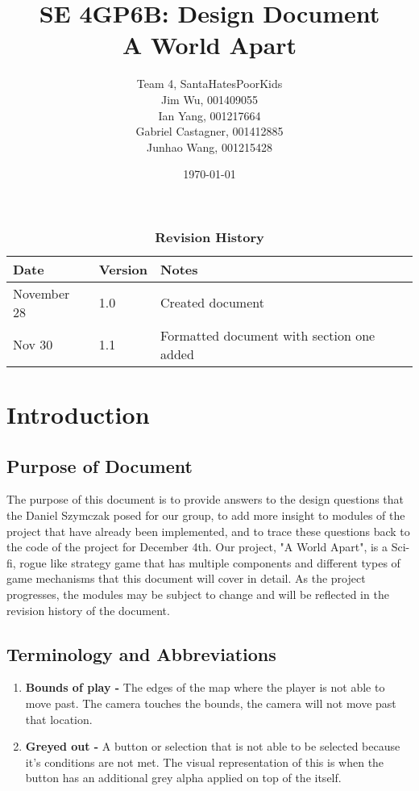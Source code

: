\documentclass[12pt, titlepage]{article}
\title{SE 4GP6B: Design Document\\A World Apart}
\author{Team 4, SantaHatesPoorKids
		\\ Jim Wu, 001409055
		\\ Ian Yang, 001217664
		\\ Gabriel Castagner, 001412885
		\\ Junhao Wang, 001215428
}
\date{\today}
\begin{document}
\maketitle

\tableofcontents
\listoftables
\listoffigures

\begin{table}[bp]
\caption{\bf Revision History}
\begin{tabularx}{\textwidth}{p{3cm}p{2cm}X}
\toprule {\bf Date} & {\bf Version} & {\bf Notes}\\
\midrule
November 28 & 1.0 & Created document\\
Nov 30 & 1.1 & Formatted document with section one added\\

\bottomrule
\end{tabularx}
\end{table}

\newpage


\section{Introduction}
\subsection{Purpose of Document}
The purpose of this document is to provide answers to the design questions that the Daniel Szymczak posed for our group, to add more insight to modules of the project that have already been implemented, and to trace these questions back to the code of the project for December 4th.
Our project, "A World Apart", is a Sci-fi, rogue like strategy game that has multiple components and different types of game mechanisms that this document will cover in detail. As the project progresses, the modules may be subject to change and will be reflected in the revision history of the document.
\subsection{Terminology and Abbreviations}
\begin{enumerate}
	\item \textbf{ Bounds of play - } The edges of the map where the player is not able to move past. The camera touches the bounds, the camera will not move past that location. 
	\item \textbf{Greyed out - } A button or selection that is not able to be selected because it's conditions are not met. The visual representation of this is when the button has an additional grey alpha applied on top of the itself.
\end{enumerate}
\end{document}
